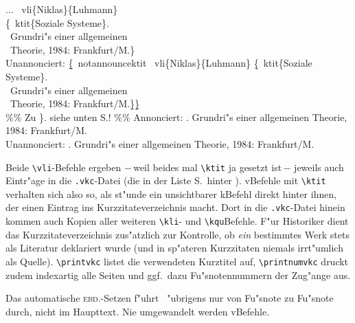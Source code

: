 \documentclass[12pt,a4paper]{article}
\newcommand{\pbs}{\string\ \unskip}
\newcommand{\bs}{\protect\pbs}
\begin{document}
\Doppelbox
{... \bs vli\{Niklas\}\{Luhmann\} 
  \\ \{\bs ktit\{Soziale Systeme\}. 
  \\ \ Grundri"s einer allgemeinen 
        \\ \ Theorie, 1984: Frankfurt/M.\}
  \\[1ex] 
  Unannonciert:
  \b{\b{\{}}\bs notannouncektit 
    \bs vli\{Niklas\}\{Luhmann\} \b{\{}\bs ktit\{Soziale Systeme\}. 
   \\ \ Grundri"s einer allgemeinen 
   \\ \ Theorie, 1984: Frankfurt/M.\b{\}}\b{\b{\}}}
   \\[.25ex] \%\% Zu \}. siehe unten S.\pageref{v-Ausnahme}! \%\%
}
{\vspace{.375ex}
 Annonciert:  {. 
      Grundri"s einer allgemeinen Theorie, 1984: Frankfurt/M.}
  \\[3.875ex] Unannonciert:
  {\notannouncektit
    {. 
        Grundri"s einer allgemeinen 
        Theorie, 1984: Frankfurt/M.}}
}

\vspace{.75ex}\noindent
Beide \verb|\vli|-Befehle ergeben $-$\,weil beides mal \verb|\ktit| ja gesetzt
ist\,$-$ jeweils auch Eintr"age in die \verb|.vkc|-Datei (die {\small\balistnumemph\thepage} 
in der Liste S.\,\pageref{vkc} hinter {\small{}}). 
v\fhy Befehle mit \verb|\ktit| verhalten sich also so, als st"unde ein unsichtbarer
k\fhy Befehl direkt hinter ihnen, der einen Eintrag ins
Kurzzitateverzeichnis macht. Dort in die \verb|.vkc|-Datei hinein
kommen auch Kopien aller weiteren \verb|\kli|- und \verb|\kqu|\hy Befehle. 
F"ur Historiker dient das Kurzzitateverzeichnis zus"atzlich zur Kontrolle,
ob \textit{ein} bestimmtes Werk stets als Literatur deklariert wurde (und in
sp"ateren Kurzzitaten niemals irrt"umlich als Quelle). \verb|\printvkc|
listet die verwendeten Kurztitel auf, \verb|\printnumvkc| druckt zudem
indexartig alle Seiten und ggf.\ dazu Fu"snotennummern der Zug"ange aus.

Das automatische \textsc{ebd.}-Setzen f"uhrt \BibArts\ "ubrigens nur von 
Fu"snote zu Fu"snote durch, nicht im Haupttext. Nie umgewandelt 
werden v\fhy Befehle.
\end{document}
